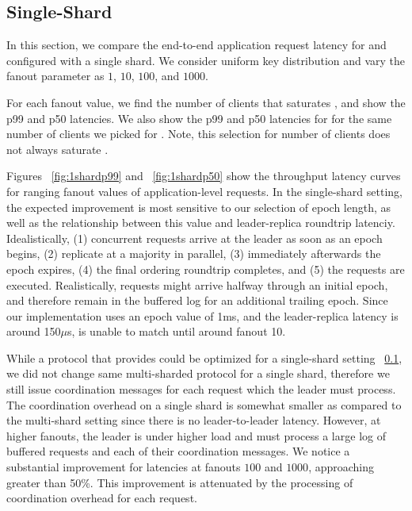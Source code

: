 \subsection{Single-Shard}
In this section, we compare the end-to-end application request latency for \system and \mpaxos configured with a single shard. We consider uniform key distribution and vary the fanout parameter as $1$, $10$, $100$, and $1000$.

For each fanout value, we find the number of clients that saturates \system, and show the p99 and p50 latencies. We also show the p99 and p50 latencies for \mpaxos for the same number of clients we picked for \system. Note, this selection for number of clients does not always saturate \mpaxos.

Figures ~\ref{fig:1shardp99} and ~\ref{fig:1shardp50} show the throughput latency curves for ranging fanout values of application-level requests. In the single-shard setting, the expected improvement is most sensitive to our selection of epoch length, as well as the relationship between this value and leader-replica roundtrip latenciy. Idealistically, (1) concurrent requests arrive at the leader as soon as an epoch begins, (2) replicate at a majority in parallel, (3) immediately afterwards the epoch expires, (4) the final ordering roundtrip completes, and (5) the requests are executed. Realistically, requests might arrive halfway through an initial epoch, and therefore remain in the buffered log for an additional trailing epoch. Since our implementation uses an epoch value of 1ms, and the leader-replica latency is around 150$\mu$s, \system is unable to match \mpaxos until around fanout 10. %

While a protocol that provides \mdl could be optimized for a single-shard setting ~\ref{}, we did not change same multi-sharded protocol for a single shard, therefore we still issue coordination messages for each request which the leader must process. The coordination overhead on a single shard is somewhat smaller as compared to the multi-shard setting since there is no leader-to-leader latency. However, at higher fanouts, the leader is under higher load and must process a large log of buffered requests and each of their coordination messages. We notice a substantial improvement for latencies at fanouts $100$ and $1000$, approaching greater than 50\%. This improvement is attenuated by the processing of coordination overhead for each request.



